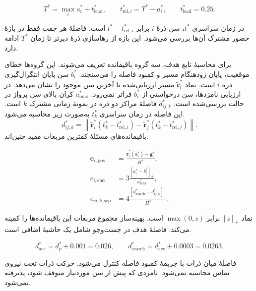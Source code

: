 \begin{equation}
T^*=\max_i a_i^*+t_{\mathrm{lead}}^*,
\qquad
t_{\mathrm{rel},i}^*=T^*-a_i^*,
\qquad
t_{\mathrm{lead}}^*=0.25.
\label{eq:formation-common-clock}
\end{equation}

در زمان سراسری $t^*$، سن ذرهٔ $i$ برابر $t^*-t_{\mathrm{rel},i}^*$ است.
فاصلهٔ هر جفت فقط در بازهٔ حضور مشترک آن‌ها بررسی می‌شود.
این بازه از رهاسازی ذرهٔ دیرتر تا زمان $T^*$ ادامه دارد.

برای محاسبهٔ تابع هدف، سه گروه باقیمانده تعریف می‌شوند.
این گروه‌ها خطای موقعیت، پایان زودهنگام مسیر و کمبود فاصله را می‌سنجند.
$b_i^*$ سن پایان انتگرال‌گیری ذرهٔ $i$ است.
نماد $\widetilde{\mathbf r}_i^*$ مسیر ارزیابی‌شده تا آخرین سن موجود را نشان می‌دهد.
در ارزیابی نامزدها، سن درخواستی از $b_i^*$ فراتر نمی‌رود.
$a_{\max}^*$ کران بالای سن پرواز در حالت بررسی‌شده است.
$d_{ij,k}^*$ فاصلهٔ مراکز دو ذره در نمونهٔ زمانی مشترک $k$ است.
این فاصله در زمان سراسری $t_k^*$ به‌صورت زیر محاسبه می‌شود.
\[
d_{ij,k}^*=
\left\|
\widetilde{\mathbf r}_i^*(t_k^*-t_{\mathrm{rel},i}^*)-
\widetilde{\mathbf r}_j^*(t_k^*-t_{\mathrm{rel},j}^*)
\right\|.
\]
باقیمانده‌های مسئلهٔ کمترین مربعات مقید چنین‌اند.

\begin{equation}
\begin{aligned}
\mathbf e_{i,\mathrm{pos}} &=
 \frac{\widetilde{\mathbf r}_i^*(a_i^*)-\mathbf g_i^*}{H^*},\\
e_{i,\mathrm{end}} &=
 3\frac{[a_i^*-b_i^*]_+}{a_{\max}^*},\\
e_{ij,k,\mathrm{sep}} &=
 4\frac{[d_{\mathrm{search}}^*-d_{ij,k}^*]_+}{H^*}.
\end{aligned}
\label{eq:formation-optimization-residuals}
\end{equation}

نماد $[z]_+$ برابر $\max(0,z)$ است.
بهینه‌ساز مجموع مربعات این باقیمانده‌ها را کمینه می‌کند.
فاصلهٔ هدف در جست‌وجو شامل یک حاشیهٔ اضافی است.

\begin{equation}
d_{\mathrm{acc}}^*=d_p^*+0.001=0.026,
\qquad
d_{\mathrm{search}}^*=d_{\mathrm{acc}}^*+0.0003=0.0263.
\label{eq:formation-clearance-thresholds}
\end{equation}

فاصلهٔ میان ذرات با جریمهٔ کمبود فاصله کنترل می‌شود.
حرکت ذرات تحت نیروی تماس محاسبه نمی‌شود.
نامزدی که پیش از سن موردنیاز متوقف شود، پذیرفته نمی‌شود.

\label{sec:formation-release-modes}

